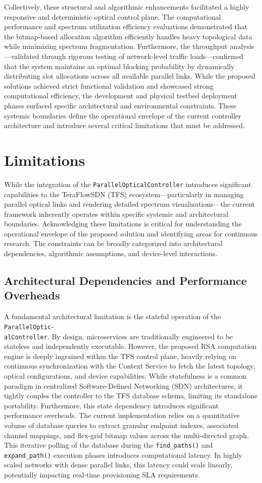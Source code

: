 Collectively, these structural and algorithmic enhancements facilitated a highly responsive and deterministic optical control plane. The computational performance and spectrum utilization efficiency evaluations demonstrated that the bitmap-based allocation algorithm efficiently handles heavy topological data while minimizing spectrum fragmentation. Furthermore, the throughput analysis—validated through rigorous testing of network-level traffic loads—confirmed that the system maintains an optimal blocking probability by dynamically distributing slot allocations across all available parallel links. While the proposed solutions achieved strict functional validation and showcased strong computational efficiency, the development and physical testbed deployment phases surfaced specific architectural and environmental constraints. These systemic boundaries define the operational envelope of the current controller architecture and introduce several critical limitations that must be addressed.
\section{Limitations}
While the integration of the \texttt{ParallelOpticalController} introduces significant capabilities to the TeraFlowSDN (TFS) ecosystem—particularly in managing parallel optical links and rendering detailed spectrum visualizations—the current framework inherently operates within specific systemic and architectural boundaries. Acknowledging these limitations is critical for understanding the operational envelope of the proposed solution and identifying areas for continuous research. The constraints can be broadly categorized into architectural dependencies, algorithmic assumptions, and device-level interactions.
\subsection*{\small Architectural Dependencies and Performance Overheads}
A fundamental architectural limitation is the stateful operation of the \texttt{ParallelOptic-\\alController}. By design, microservices are traditionally engineered to be stateless and independently executable. However, the proposed RSA computation engine is deeply ingrained within the TFS control plane, heavily relying on continuous synchronization with the Context Service to fetch the latest topology, optical configurations, and device capabilities. While statefulness is a common paradigm in centralized Software-Defined Networking (SDN) architectures, it tightly couples the controller to the TFS database schema, limiting its standalone portability. Furthermore, this state dependency introduces significant performance overheads. The current implementation relies on a quantitative volume of database queries to extract granular endpoint indexes, associated channel mappings, and flex-grid bitmap values across the multi-directed graph. This iterative polling of the database during the \texttt{find\_paths()} and \texttt{expand\_path()} execution phases introduces computational latency. In highly scaled networks with dense parallel links, this latency could scale linearly, potentially impacting real-time provisioning SLA requirements.

